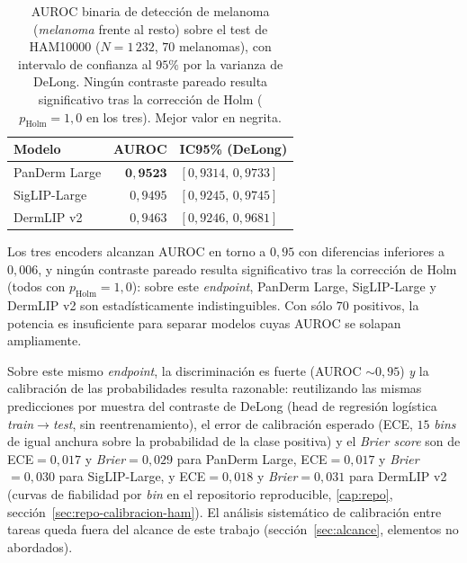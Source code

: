 \begin{table}[htbp]
\centering
\footnotesize
\setlength{\tabcolsep}{4pt}
\renewcommand{\arraystretch}{0.95}
\caption{AUROC binaria de detección de melanoma (\emph{melanoma} frente
al resto) sobre el test de HAM10000 ($N = 1\,232$, $70$ melanomas), con
intervalo de confianza al $95\%$ por la varianza de DeLong. Ningún
contraste pareado resulta significativo tras la corrección de Holm
($p_{\mathrm{Holm}} = 1{,}0$ en los tres). Mejor valor en negrita.}
\label{tab:delong-ham}
\begin{tabular}{lrl}
\hline
Modelo          & AUROC               & IC95\% (DeLong) \\
\hline
PanDerm Large   & $\mathbf{0{,}9523}$ & $[0{,}9314,\, 0{,}9733]$ \\
SigLIP-Large    & $0{,}9495$          & $[0{,}9245,\, 0{,}9745]$ \\
DermLIP v2      & $0{,}9463$          & $[0{,}9246,\, 0{,}9681]$ \\
\hline
\end{tabular}
\end{table}

Los tres encoders alcanzan AUROC en torno a $0{,}95$ con
diferencias inferiores a $0{,}006$, y ningún contraste pareado resulta
significativo tras la corrección de Holm (todos con $p_{\mathrm{Holm}} =
1{,}0$): sobre este \emph{endpoint}, PanDerm Large, SigLIP-Large y
DermLIP v2 son estadísticamente indistinguibles. Con sólo $70$
positivos, la potencia es insuficiente para separar modelos cuyas AUROC
se solapan ampliamente.

Sobre este mismo \emph{endpoint}, la discriminación es fuerte
(AUROC $\sim 0{,}95$) \emph{y} la calibración de las probabilidades
resulta razonable: reutilizando las mismas predicciones por muestra
del contraste de DeLong (head de regresión logística \emph{train}$\to$\emph{test},
sin reentrenamiento), el error de calibración esperado
(ECE, $15$ \emph{bins} de igual anchura sobre la probabilidad de la
clase positiva) y el \emph{Brier score} son de
ECE${}=0{,}017$ y \emph{Brier}${}=0{,}029$ para PanDerm Large,
ECE${}=0{,}017$ y \emph{Brier}${}=0{,}030$ para SigLIP-Large, y
ECE${}=0{,}018$ y \emph{Brier}${}=0{,}031$ para DermLIP v2 (curvas de
fiabilidad por \emph{bin} en el repositorio reproducible,
\ref{cap:repo}, sección~\ref{sec:repo-calibracion-ham}). El análisis
sistemático de calibración entre tareas queda fuera del alcance de este
trabajo (sección~\ref{sec:alcance}, elementos no abordados).


